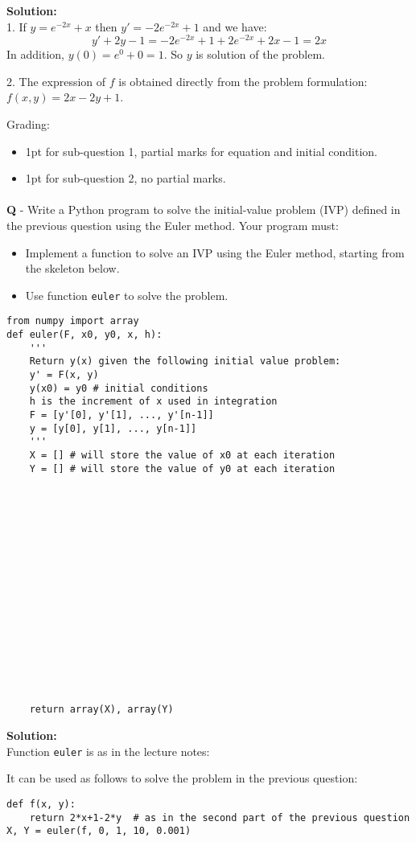 \documentclass{llncs}
\newcounter{ques}
\renewcommand{\question}[1]{\paragraph{}\textbf{Q\theques} - #1\stepcounter{ques} }
\newcommand{\answer}[1]{\color{red}\textbf{Solution:}\\#1\color{black}}
\begin{document}
\answer{
1. If $y = e^{-2x} + x$ then $y' = -2e^{-2x} + 1$ and we have:
$$
y'+2y-1 = -2e^{-2x} + 1 + 2e^{-2x} +2x -1 = 2x
$$
In addition, $y(0) = e^0 + 0 = 1$.
So $y$ is solution of the problem.

2. The expression of $f$ is obtained directly from the problem formulation: $f(x, y)=2x-2y+1$.

Grading:
\begin{itemize}
\item 1pt for sub-question 1, partial marks for equation and initial condition.
\item 1pt for sub-question 2, no partial marks.
\end{itemize}
}
\newpage

\question{Write a Python program to solve the initial-value problem (IVP) defined in the previous question using the Euler method. Your program must:
\begin{itemize}
\item Implement a function to solve an IVP using the Euler method, starting from the skeleton below.
\item Use function \texttt{euler} to solve the problem.
\end{itemize}
}
\begin{verbatim}
from numpy import array
def euler(F, x0, y0, x, h):
    '''
    Return y(x) given the following initial value problem:
    y' = F(x, y)
    y(x0) = y0 # initial conditions
    h is the increment of x used in integration
    F = [y'[0], y'[1], ..., y'[n-1]]
    y = [y[0], y[1], ..., y[n-1]]
    '''
    X = [] # will store the value of x0 at each iteration
    Y = [] # will store the value of y0 at each iteration

















    return array(X), array(Y)
\end{verbatim}

\answer{Function \texttt{euler} is as in the lecture notes:

It can be used as follows to solve the problem in the previous question:}
\begin{verbatim}
def f(x, y):
    return 2*x+1-2*y  # as in the second part of the previous question
X, Y = euler(f, 0, 1, 10, 0.001)
\end{verbatim}
\end{document}
